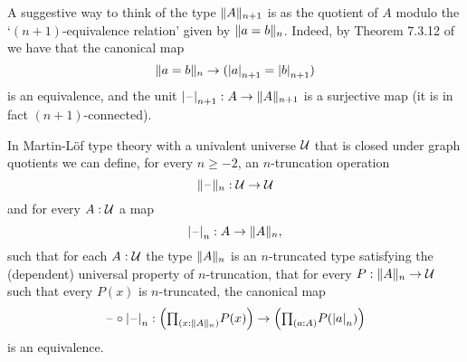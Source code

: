A suggestive way to think of the type $\trunc{n+1}{A}$ is as the quotient of $A$ modulo the
`$(n+1)$-equivalence relation' given by $\trunc{n}{a=b}$. 
Indeed, by Theorem 7.3.12 of \cite{hottbook} we have that the canonical map
\begin{equation*}
\trunc{n}{a=b}\to(\tproj{n+1}{a}=\tproj{n+1}{b})
\end{equation*}
is an equivalence, and the unit $\tproj{n+1}{\blank}:A\to \trunc{n+1}{A}$ is
a surjective map (it is in fact $(n+1)$-connected). 

\begin{thm}\label{thm:truncation}
In Martin-L\"of type theory with a univalent universe $\UU$ that is closed under
graph quotients we can define, for every $n\geq -2$, an $n$-truncation operation
\begin{equation*}
\trunc{n}{\blank} : \UU\to\UU
\end{equation*}
and for every $A:\UU$ a map
\begin{equation*}
\tproj{n}{\blank}:A\to\trunc{n}{A},
\end{equation*}
such that for each $A:\UU$ the type $\trunc{n}{A}$ is an $n$-truncated type satisfying the (dependent) universal property of $n$-truncation, that for every $P:\trunc{n}{A}\to\UU$ such that every $P(x)$ is $n$-truncated,
the canonical map
\begin{equation*}
\blank\circ\tproj{n}{\blank} : \Big(\prd{x:\trunc{n}{A}}P(x)\Big)\to\Big(\prd{a:A}P(\tproj{n}{a})\Big)
\end{equation*}
is an equivalence.
\end{thm}

